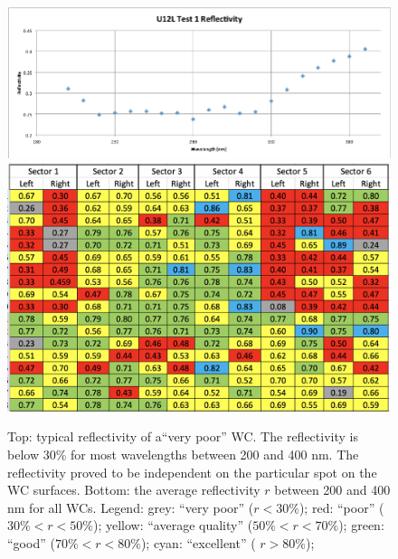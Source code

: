 \begin{figure}
	\centering
	\includegraphics[width=0.95\columnwidth,keepaspectratio]{img/winstoConeSample2Reflectivity.png}
	\includegraphics[width=0.95\columnwidth,keepaspectratio]{img/wcStatusBefore.png}
	\caption{Top: typical reflectivity of a``very poor'' WC. The reflectivity is below 30\% for most wavelengths between 200 and 400 nm. The reflectivity proved to be independent on the
				particular spot on the WC surfaces.
            Bottom: the average reflectivity $r$ between 200 and 400 nm for all WCs. Legend: grey: ``very poor'' ($r < 30\%$);
            red: ``poor'' ($30\% < r < 50\%$); yellow: ``average quality'' ($50\% < r < 70\%$); green: ``good'' ($70\% < r < 80\%$); cyan: ``excellent'' ( $r > 80\%$); }
	\label{fig:wcStatusBefore}
\end{figure}


